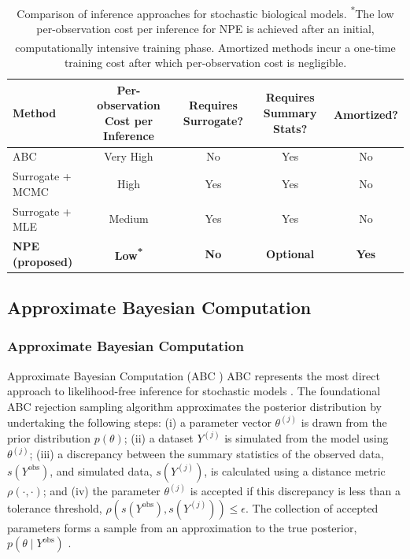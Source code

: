 \documentclass{article}
\providecommand{\DIFaddtex}[1]{{\protect\color{blue} \sf #1}} %
\providecommand{\DIFdeltex}[1]{{\protect\color{red} \scriptsize #1}} %
\providecommand{\DIFaddbegin}{} %
\providecommand{\DIFaddend}{} %
\providecommand{\DIFdelbegin}{} %
\providecommand{\DIFdelend}{} %
\providecommand{\DIFaddFL}[1]{\DIFadd{#1}} %
\providecommand{\DIFdelFL}[1]{\DIFdel{#1}} %
\providecommand{\DIFaddbeginFL}{} %
\providecommand{\DIFaddendFL}{} %
\providecommand{\DIFdelbeginFL}{} %
\providecommand{\DIFdelendFL}{} %
\providecommand{\DIFadd}[1]{\texorpdfstring{\DIFaddtex{#1}}{#1}} %
\providecommand{\DIFdel}[1]{\texorpdfstring{\DIFdeltex{#1}}{}} %
\newcommand{\DIFscaledelfig}{0.5}
\newlength{\DIFdelgraphicswidth} %
\newlength{\DIFdelgraphicsheight} %
\newcommand{\DIFaddincludegraphics}[2][]{{\color{blue}\fbox{\DIFOincludegraphics[#1]{#2}}}} %
\newcommand{\DIFdelincludegraphics}[2][]{%
\sbox{\DIFdelgraphicsbox}{\DIFOincludegraphics[#1]{#2}}%
\settoboxwidth{\DIFdelgraphicswidth}{\DIFdelgraphicsbox} %
\settoboxtotalheight{\DIFdelgraphicsheight}{\DIFdelgraphicsbox} %
\scalebox{\DIFscaledelfig}{%
\parbox[b]{\DIFdelgraphicswidth}{\usebox{\DIFdelgraphicsbox}\\[-\baselineskip] \rule{\DIFdelgraphicswidth}{0em}}\llap{\resizebox{\DIFdelgraphicswidth}{\DIFdelgraphicsheight}{%
\setlength{\unitlength}{\DIFdelgraphicswidth}%
\begin{picture}(1,1)%
\thicklines\linethickness{2pt} %
{\color[rgb]{1,0,0}\put(0,0){\framebox(1,1){}}}%
{\color[rgb]{1,0,0}\put(0,0){\line( 1,1){1}}}%
{\color[rgb]{1,0,0}\put(0,1){\line(1,-1){1}}}%
\end{picture}%
}\hspace*{3pt}}} %
} %
\DeclareRobustCommand{\DIFaddbegin}{\DIFOaddbegin \let\includegraphics\DIFaddincludegraphics} %
\DeclareRobustCommand{\DIFaddend}{\DIFOaddend \let\includegraphics\DIFOincludegraphics} %
\DeclareRobustCommand{\DIFdelbegin}{\DIFOdelbegin \let\includegraphics\DIFdelincludegraphics} %
\DeclareRobustCommand{\DIFdelend}{\DIFOaddend \let\includegraphics\DIFOincludegraphics} %
\DeclareRobustCommand{\DIFaddbeginFL}{\DIFOaddbeginFL \let\includegraphics\DIFaddincludegraphics} %
\DeclareRobustCommand{\DIFaddendFL}{\DIFOaddendFL \let\includegraphics\DIFOincludegraphics} %
\DeclareRobustCommand{\DIFdelbeginFL}{\DIFOdelbeginFL \let\includegraphics\DIFdelincludegraphics} %
\DeclareRobustCommand{\DIFdelendFL}{\DIFOaddendFL \let\includegraphics\DIFOincludegraphics} %
\begin{document}
\begin{table}[htbp]
	\centering
	\renewcommand{\arraystretch}{1.3} %
	\begin{tabular}{@{}lcccc@{}}
		\toprule
		\textbf{Method} & \textbf{\DIFaddbeginFL \DIFaddFL{Per-observation }\DIFaddendFL Cost\DIFdelbeginFL \DIFdelFL{per Inference}\DIFdelendFL } & \textbf{Requires Surrogate?} & \textbf{Requires Summary Stats?} & \textbf{Amortized?\DIFaddbeginFL \DIFaddFL{\textsuperscript{\dag}}\DIFaddendFL } \\
		\midrule
		ABC & Very High & No & Yes & No \\
		Surrogate + MCMC & High & Yes & Yes & No \\
		Surrogate + MLE & Medium & Yes & Yes & No \\
		\textbf{NPE (proposed)} & \textbf{Low\textsuperscript{*}} & \textbf{No} & \textbf{Optional} & \textbf{Yes} \\
		\bottomrule
	\end{tabular}
	\vspace{0.2cm}
	\caption{Comparison of inference approaches for stochastic biological models. \textsuperscript{*}The low \DIFaddbeginFL \DIFaddFL{per-observation }\DIFaddendFL cost \DIFdelbeginFL \DIFdelFL{per inference }\DIFdelendFL for NPE is achieved after an initial, computationally intensive training phase. \DIFaddbeginFL \DIFaddFL{\textsuperscript{\dag}Amortized methods incur a one-time training cost after which per-observation cost is negligible.}\DIFaddendFL }
	\label{tab:method_comparison}
\end{table}

\DIFdelbegin \subsection{\DIFdel{Approximate Bayesian Computation}}
\addtocounter{subsection}{-1}%
\DIFdelend \DIFaddbegin \subsubsection{\DIFadd{Approximate Bayesian Computation}}
\DIFaddend 

\DIFdelbegin \DIFdel{Approximate Bayesian Computation (ABC )  }\DIFdelend \DIFaddbegin \DIFadd{ABC }\DIFaddend represents the most direct approach to likelihood-free inference for stochastic models \citep{SunnkerABC,Sisson2018,Tavare1997,Pritchard1999}. The foundational ABC rejection sampling algorithm approximates the posterior distribution by undertaking the following steps: (i) a parameter vector $\theta^{(j)}$ is drawn from the prior distribution $p(\theta)$; (ii) a dataset $Y^{(j)}$ is simulated from the model using $\theta^{(j)}$; (iii) a discrepancy between the summary statistics of the observed data, $s(Y^{\text{obs}})$, and simulated data, $s(Y^{(j)})$, is calculated using a distance metric $\rho(\cdot, \cdot)$; and (iv) the parameter $\theta^{(j)}$ is accepted if this discrepancy is less than a tolerance threshold, $\rho(s(Y^{\text{obs}}), s(Y^{(j)})) \le \epsilon$. The collection of accepted parameters forms a sample from an approximation to the true posterior, $p(\theta \mid Y^{\text{obs}})$ \citep{Beaumont2002}.
\end{document}
